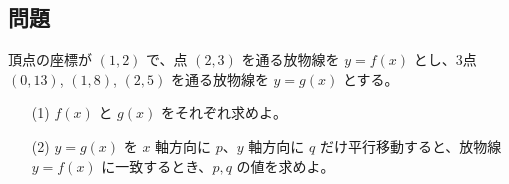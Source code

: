 \documentclass[8pt,dvipdfmx]{article}
\begin{document}
\begin{tcolorbox}[title=数学\textcircled{1} 1-2 AB]
\section*{問題}

頂点の座標が \((1,2)\) で、点 \((2,3)\) を通る放物線を \(y = f(x)\) とし、3点 \((0,13)\), \((1,8)\), \((2,5)\) を通る放物線を \(y = g(x)\) とする。
\begin{enumerate}
    \item[(1)] \(f(x)\) と \(g(x)\) をそれぞれ求めよ。
    \vspace{2mm} %
    \item[(2)] \(y = g(x)\) を \(x\) 軸方向に \(p\)、\(y\) 軸方向に \(q\) だけ平行移動すると、放物線 \(y = f(x)\) に一致するとき、\(p, q\) の値を求めよ。
\end{enumerate}
\end{tcolorbox}
\end{document}
